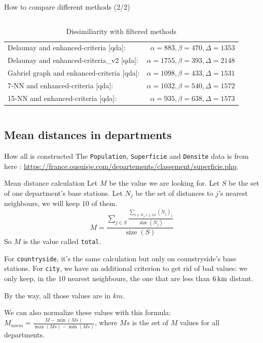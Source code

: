 \begin{frame}{How to compare different methods (2/2)}
\begin{table}[!ht]
\begin{columns}
\begin{column}{0.5\paperwidth}
\begin{tabular}{lr}
                    Delaunay and enhanced-criteria [qda]: & $\alpha = 883, \beta = 470, \Delta = 1353$\\
                    Delaunay and enhanced-criteria\_v2 [qda]: & $\alpha = 1755, \beta = 393, \Delta = 2148$\\
                    Gabriel graph and enhanced-criteria [qda]: & $\alpha = 1098, \beta = 433, \Delta = 1531$\\
                    7-NN and enhanced-criteria [qda]: & $\alpha = 1032, \beta = 540, \Delta = 1572$\\
                    15-NN and enhanced-criteria [qda]: & $\alpha = 935, \beta = 638, \Delta = 1573$\\
                \end{tabular}
            \end{column}
        \end{columns}
        \caption{Dissimiliarity with filtered methods}
    \end{table}
\end{frame}

\subsection{Mean distances in departments}
\insertsubsectionframe

\begin{frame}{How all is constructed}
    The \texttt{Population}, \texttt{Superficie} and \texttt{Densite} data is from here : \url{https://france.ousuisje.com/departements/classement/superficie.php}.

    \begin{block}{Mean distance calculation}
        Let $M$ be the value we are looking for. Let $S$ be the set of one department's base stations. Let $N_j$ be the set of distances to $j$'s nearest neighbours, we will keep $10$ of them.
        \[
            M = \frac{\sum_{j\in S}\frac{\sum_{i\in N_j, i\leqslant 10}{(N_j)_i}}{\mathrm{\mathop{size}}(N_j)}}{\mathrm{\mathop{size}}(S)}
        \]
        So $M$ is the value called \texttt{total}.

        For \texttt{countryside}, it's the same calculation but only on counstryside's base stations. For \texttt{city}, we have an additional criterion to get rid of bad values:
        we only keep, in the $10$ nearest neighbours, the one that are less than $\unit[6]{km}$ distant.

        By the way, all those values are in $\unit{km}$.
    \end{block}

    We can also normalize these values with this formula: $M_{norm}=\frac{M-\min(Ms)}{\max(Ms)-\min(Ms)}$, where $Ms$ is the set of $M$ values for all departments.
\end{frame}


